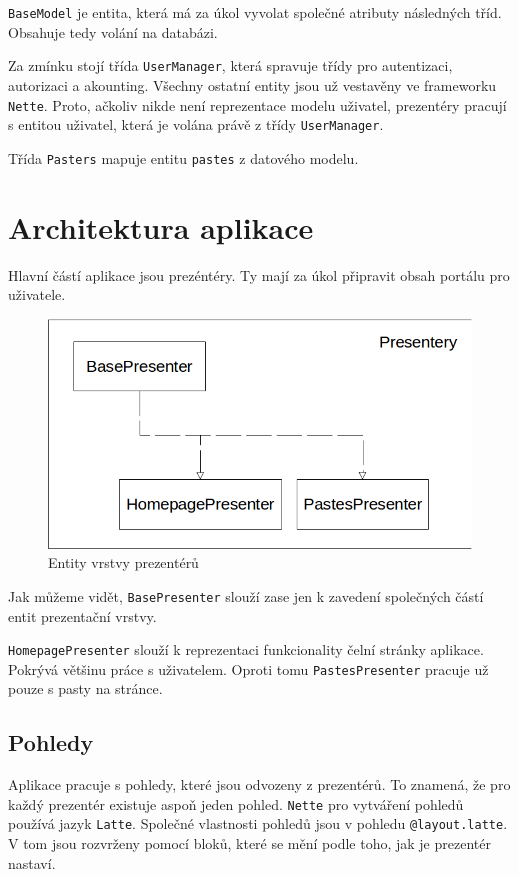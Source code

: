 \documentclass[a4paper,10pt]{report}
\begin{document}
\texttt{BaseModel} je entita, která má za úkol vyvolat společné atributy následných tříd. Obsahuje tedy volání na databázi.

Za zmínku stojí třída \texttt{UserManager}, která spravuje třídy pro autentizaci, autorizaci a akounting. Všechny ostatní entity jsou už vestavěny ve frameworku \texttt{Nette}. Proto, ačkoliv nikde není reprezentace modelu uživatel, prezentéry pracují s entitou uživatel, která je volána právě z třídy \texttt{UserManager}.

Třída \texttt{Pasters} mapuje entitu \texttt{pastes} z datového modelu.

\section{Architektura aplikace}

Hlavní částí aplikace jsou prezéntéry. Ty mají za úkol připravit obsah portálu pro uživatele.

\begin{figure}[H]
  \centering
	\includegraphics[scale=0.5]{presentery.png} 
  \caption{Entity vrstvy prezentérů}
  \label{presenter}
\end{figure}

Jak můžeme vidět, \texttt{BasePresenter} slouží zase jen k zavedení společných částí entit prezentační vrstvy.

\texttt{HomepagePresenter} slouží k reprezentaci funkcionality čelní stránky aplikace. Pokrývá většinu práce s uživatelem. Oproti tomu \texttt{PastesPresenter} pracuje už pouze s pasty na stránce.

\subsection{Pohledy}

Aplikace pracuje s pohledy, které jsou odvozeny z prezentérů. To znamená, že pro každý prezentér existuje aspoň jeden pohled. \texttt{Nette} pro vytváření pohledů používá jazyk \texttt{Latte}. Společné vlastnosti pohledů jsou v pohledu \texttt{@layout.latte}. V tom jsou rozvrženy pomocí bloků, které se mění podle toho, jak je prezentér nastaví.
\end{document}
